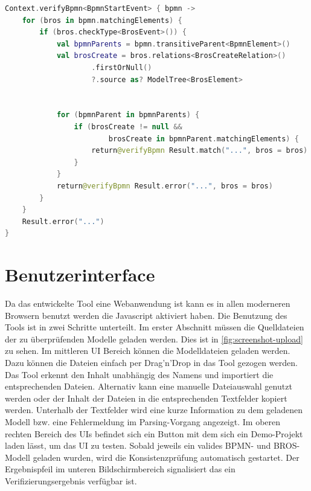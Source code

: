 \begin{lstlisting}[language=Kotlin, caption=Implementierung von Regel 5, label=lst:implementation_rule_5]
Context.verifyBpmn<BpmnStartEvent> { bpmn ->
    for (bros in bpmn.matchingElements) {
        if (bros.checkType<BrosEvent>()) {
            val bpmnParents = bpmn.transitiveParent<BpmnElement>()
            val brosCreate = bros.relations<BrosCreateRelation>()
                    .firstOrNull()
                    ?.source as? ModelTree<BrosElement>


            for (bpmnParent in bpmnParents) {
                if (brosCreate != null && 
                        brosCreate in bpmnParent.matchingElements) {
                    return@verifyBpmn Result.match("...", bros = bros)
                }
            }
            return@verifyBpmn Result.error("...", bros = bros)
        }
    }
    Result.error("...")
}
\end{lstlisting}

\section{Benutzerinterface}

Da das entwickelte Tool eine Webanwendung ist kann es in allen moderneren Browsern benutzt werden die Javascript aktiviert haben.
Die Benutzung des Tools ist in zwei Schritte unterteilt.
Im erster Abschnitt müssen die Quelldateien der zu überprüfenden Modelle geladen werden.
Dies ist in \cref{fig:screenshot-upload} zu sehen.
Im mittleren UI Bereich können die Modelldateien geladen werden.
Dazu können die Dateien einfach per Drag'n'Drop in das Tool gezogen werden.
Das Tool erkennt den Inhalt unabhängig des Namens und importiert die entsprechenden Dateien.
Alternativ kann eine manuelle Dateiauswahl genutzt werden oder der Inhalt der Dateien in die entsprechenden Textfelder kopiert werden.
Unterhalb der Textfelder wird eine kurze Information zu dem geladenen Modell bzw. eine Fehlermeldung im Parsing-Vorgang angezeigt.
Im oberen rechten Bereich des UIs befindet sich ein Button mit dem sich ein Demo-Projekt laden lässt, um das UI zu testen.
Sobald jeweils ein valides BPMN- und BROS-Modell geladen wurden, wird die Konsistenzprüfung automatisch gestartet.
Der Ergebnispfeil im unteren Bildschirmbereich signalisiert das ein Verifizierungsergebnis verfügbar ist.


